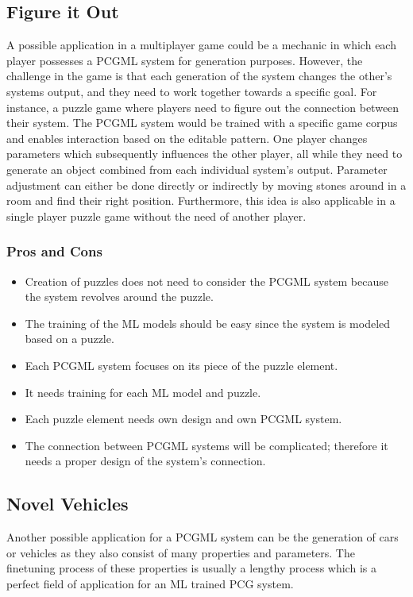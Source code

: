 \documentclass[MGS,Master,english]{twbook}%
\begin{document}
\subsection{Figure it Out} \label{idea::figureItOut}
A possible application in a multiplayer game could be a mechanic in which each player possesses a \ac{PCGML} system for generation purposes. However, the challenge in the game is that each generation of the system changes the other’s systems output, and they need to work together towards a specific goal. For instance, a puzzle game where players need to figure out the connection between their system. The \ac{PCGML} system would be trained with a specific game corpus and enables interaction based on the editable pattern. One player changes parameters which subsequently influences the other player, all while they need to generate an object combined from each individual system's output. Parameter adjustment can either be done directly or indirectly by moving stones around in a room and find their right position. Furthermore, this idea is also applicable in a single player puzzle game without the need of another player.

\subsubsection{Pros and Cons}
\begin{itemize}
	\item Creation of puzzles does not need to consider the \ac{PCGML} system because the system revolves around the puzzle.
	\item The training of the \ac{ML} models should be easy since the system is modeled based on a puzzle. 
	\item Each \ac{PCGML} system focuses on its piece of the puzzle element.
	\item It needs training for each \ac{ML} model and puzzle.
	\item Each puzzle element needs own design and own \ac{PCGML} system.
	\item The connection between \ac{PCGML} systems will be complicated; therefore it needs a proper design of the system’s connection.
\end{itemize}


\subsection{Novel Vehicles} \label{idea::novelCars}
Another possible application for a \ac{PCGML} system can be the generation of cars or vehicles as they also consist of many properties and parameters. The finetuning process of these properties is usually a lengthy process which is a perfect field of application for an \ac{ML} trained \ac{PCG} system.
\end{document}
